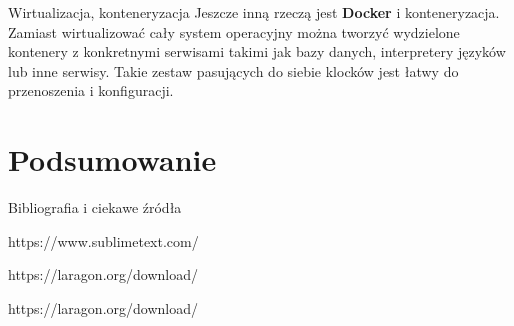 \begin{frame}{Wirtualizacja, konteneryzacja}	
	Jeszcze inną rzeczą jest \textbf{Docker} i konteneryzacja. Zamiast wirtualizować cały system operacyjny można tworzyć wydzielone kontenery z konkretnymi serwisami takimi jak bazy danych, interpretery języków lub inne serwisy. Takie zestaw pasujących do siebie klocków jest łatwy do przenoszenia i konfiguracji.
\end{frame}

\section{Podsumowanie}

\begin{frame}{Bibliografia i ciekawe źródła}
  
	\begin{thebibliography}{9}
	
		https://www.sublimetext.com/
		
		https://laragon.org/download/
		
		https://laragon.org/download/
	
	\end{thebibliography}

\end{frame}

